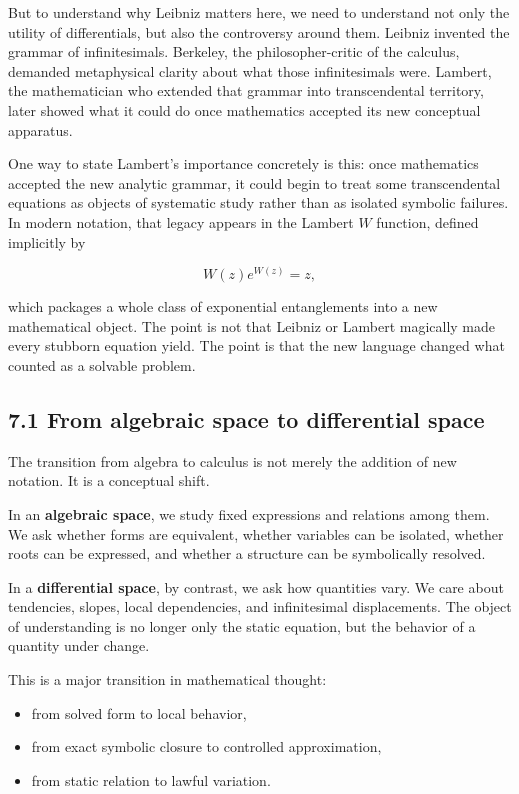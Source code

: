 But to understand why Leibniz matters here, we need to understand not
only the utility of differentials, but also the controversy around them.
Leibniz invented the grammar of infinitesimals. Berkeley, the
philosopher-critic of the calculus, demanded metaphysical clarity about
what those infinitesimals were. Lambert, the mathematician who extended
that grammar into transcendental territory, later showed what it could
do once mathematics accepted its new conceptual apparatus.

One way to state Lambert's importance concretely is this: once
mathematics accepted the new analytic grammar, it could begin to treat
some transcendental equations as objects of systematic study rather than
as isolated symbolic failures. In modern notation, that legacy appears
in the Lambert \(W\) function, defined implicitly by

\[
W(z)e^{W(z)} = z,
\]

which packages a whole class of exponential entanglements into a new
mathematical object. The point is not that Leibniz or Lambert magically
made every stubborn equation yield. The point is that the new language
changed what counted as a solvable problem.

\hypertarget{from-algebraic-space-to-differential-space}{%
\subsection{7.1 From algebraic space to differential
space}\label{from-algebraic-space-to-differential-space}}

The transition from algebra to calculus is not merely the addition of
new notation. It is a conceptual shift.

In an \textbf{algebraic space}, we study fixed expressions and relations
among them. We ask whether forms are equivalent, whether variables can
be isolated, whether roots can be expressed, and whether a structure can
be symbolically resolved.

In a \textbf{differential space}, by contrast, we ask how quantities
vary. We care about tendencies, slopes, local dependencies, and
infinitesimal displacements. The object of understanding is no longer
only the static equation, but the behavior of a quantity under change.

This is a major transition in mathematical thought:

\begin{itemize}
\tightlist
\item
  from solved form to local behavior,
\item
  from exact symbolic closure to controlled approximation,
\item
  from static relation to lawful variation.
\end{itemize}

